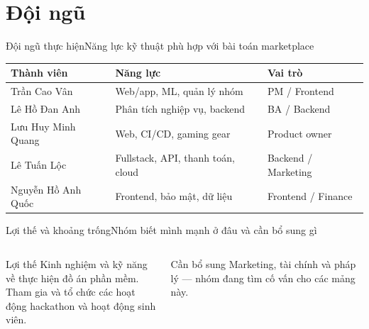 \section{Đội ngũ}

\begin{frame}{Đội ngũ thực hiện}{Năng lực kỹ thuật phù hợp với bài toán marketplace}
  \vspace{.6em}
  \small
  \begin{tabularx}{.9\textwidth}{@{}lXl@{}}
    \toprule
    \textbf{Thành viên} & \textbf{Năng lực} & \textbf{Vai trò} \\
    \midrule
    Trần Cao Vân & Web/app, ML, quản lý nhóm & PM / Frontend \\
    Lê Hồ Đan Anh & Phân tích nghiệp vụ, backend & BA / Backend \\
    Lưu Huy Minh Quang & Web, CI/CD, gaming gear & Product owner \\
    Lê Tuấn Lộc & Fullstack, API, thanh toán, cloud & Backend / Marketing \\
    Nguyễn Hồ Anh Quốc & Frontend, bảo mật, dữ liệu & Frontend / Finance \\
    \bottomrule
  \end{tabularx}
\end{frame}

\begin{frame}{Lợi thế và khoảng trống}{Nhóm biết mình mạnh ở đâu và cần bổ sung gì}
  \vspace{1.2em}
  \begin{columns}[T,onlytextwidth]
      \begin{exampleblock}{Lợi thế}
        Kinh nghiệm và kỹ năng về thực hiện đồ án phần mềm. \\
        Tham gia và tổ chức các hoạt động hackathon và hoạt động sinh viên.
      \end{exampleblock}
      \begin{block}{Cần bổ sung}
        Marketing, tài chính và pháp lý --- nhóm đang tìm cố vấn cho các mảng này.
      \end{block}
  \end{columns}
\end{frame}
